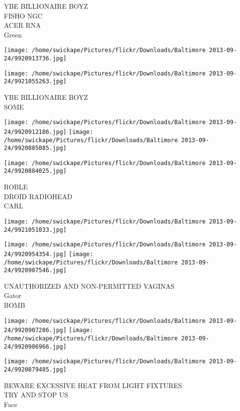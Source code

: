 \documentclass[10pt,letterpaper]{article}
\begin{document}
YBE BILLIONAIRE BOYZ\\
FISHO NGC\\
ACER RNA\\
Green
\pagebreak

\texttt{[image: /home/swickape/Pictures/flickr/Downloads/Baltimore 2013-09-24/9920913736.jpg]}

\vspace{0.25in}
\texttt{[image: /home/swickape/Pictures/flickr/Downloads/Baltimore 2013-09-24/9921055263.jpg]}

YBE BILLIONAIRE BOYZ\\
SOME
\pagebreak

\texttt{[image: /home/swickape/Pictures/flickr/Downloads/Baltimore 2013-09-24/9920912186.jpg]}
\texttt{[image: /home/swickape/Pictures/flickr/Downloads/Baltimore 2013-09-24/9920885085.jpg]}

\vspace{0.25in}
\texttt{[image: /home/swickape/Pictures/flickr/Downloads/Baltimore 2013-09-24/9920884025.jpg]}

ROBLE\\
DROID RADIOHEAD\\
CARL
\pagebreak

\texttt{[image: /home/swickape/Pictures/flickr/Downloads/Baltimore 2013-09-24/9921051033.jpg]}

\vspace{0.25in}
\texttt{[image: /home/swickape/Pictures/flickr/Downloads/Baltimore 2013-09-24/9920954354.jpg]}
\texttt{[image: /home/swickape/Pictures/flickr/Downloads/Baltimore 2013-09-24/9920907546.jpg]}

UNAUTHORIZED AND NON{-}PERMITTED VAGINAS\\
Gator\\
BOMB
\pagebreak

\texttt{[image: /home/swickape/Pictures/flickr/Downloads/Baltimore 2013-09-24/9920907286.jpg]}
\texttt{[image: /home/swickape/Pictures/flickr/Downloads/Baltimore 2013-09-24/9920906966.jpg]}

\vspace{0.25in}
\texttt{[image: /home/swickape/Pictures/flickr/Downloads/Baltimore 2013-09-24/9920879485.jpg]}

BEWARE EXCESSIVE HEAT FROM LIGHT FIXTURES\\
TRY AND STOP US\\
Face
\pagebreak
\end{document}
